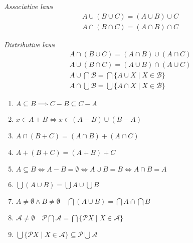 \documentclass[letterpaper, 10pt]{article}
\numberwithin{thm}{section}
\theoremstyle{definition}
\begin{document}
\emph{Associative laws}
\begin{gather*}
	A \cup (B \cup C) = (A \cup B) \cup C \\
	A \cap (B \cap C) = (A \cap B) \cap C
\end{gather*}

\emph{Distributive laws}
\begin{gather*}
	A \cap (B \cup C) = (A \cap B) \cup (A \cap C) \\
	A \cup (B \cap C) = (A \cup B) \cap (A \cup C) \\
	A \cup \bigcap\mathscr{B} = \bigcap \{A \cup X \mid X \in \mathscr{B}\} \\
	A \cap \bigcup\mathscr{B} = \bigcup \{A \cap X \mid X \in \mathscr{B}\}
\end{gather*}

\begin{enumerate}[label=\arabic*.]
	\item $ A \subseteq B \implies C - B \subseteq C - A $
	\item $ x \in A + B \iff x\in (A - B) \cup (B - A) $
	\item $ A \cap (B + C) = (A \cap B) + (A \cap C) $
	\item $ A + (B + C) = (A + B) + C  $
	\item $ A \subseteq B \iff A - B = \emptyset \iff 
		A \cup B = B \iff A \cap B = A  $
	\item $ \bigcup (A \cup B) = \bigcup A \cup \bigcup B $
	\item $ A \ne \emptyset \land B \ne \emptyset \quad \bigcap (A \cup B) =
		\bigcap A \cap \bigcap B $
	\item $ \mathscr{A} \ne \emptyset \quad \mathscr{P}\bigcap\mathscr{A} =
		\bigcap\{\mathscr{P}X \mid X \in \mathscr{A}\} $
	\item $ \bigcup\{\mathscr{P}X \mid X \in \mathscr{A}\} \subseteq 
		\mathscr{P}\bigcup\mathscr{A} $
\end{enumerate}
\end{document}
